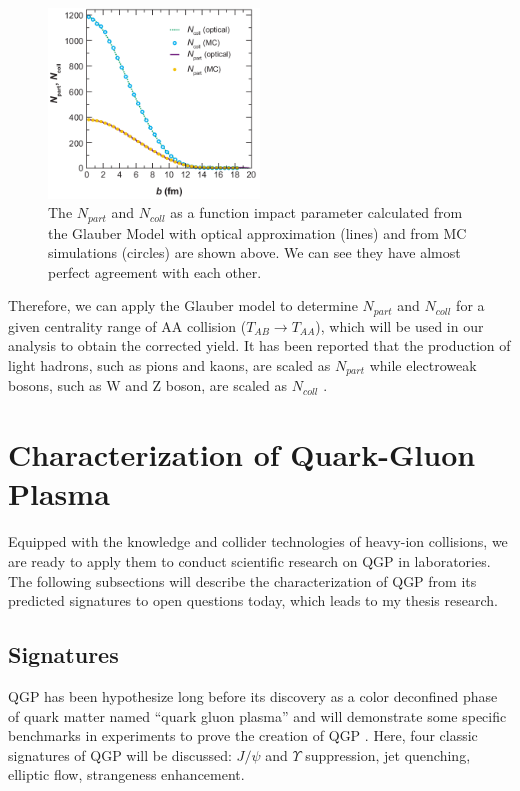 \begin{figure}[hbtp]
\begin{center}
\includegraphics[width=0.50\textwidth]{Figures/Chapter1/NPartandNColl.png}
\caption{The $N_{part}$ and $N_{coll}$ as a function impact parameter calculated from the Glauber Model with optical approximation (lines) and from MC simulations (circles) are shown above. We can see they have almost perfect agreement with each other.}
\label{NPartandNColl}
\end{center}
\end{figure} 


Therefore, we can apply the Glauber model to determine $N_{part}$ and $N_{coll}$ for a given centrality range of AA collision ($T_{AB} \rightarrow T_{AA}$), which will be used in our analysis to obtain the corrected yield. It has been reported that the production of light hadrons, such as pions and kaons, are scaled as $N_{part}$ \cite{NPartScaling} while electroweak bosons, such as W and Z boson, are scaled as $N_{coll}$ \cite{NCollScaling}.

\section{Characterization of Quark-Gluon Plasma}

Equipped with the knowledge and collider technologies of heavy-ion collisions, we are ready to apply them to conduct scientific research on QGP in laboratories. The following subsections will describe the characterization of QGP from its predicted signatures to open questions today, which leads to my thesis research.

\subsection{Signatures}

QGP has been hypothesize long before its discovery as a color deconfined phase of quark matter named ``quark gluon plasma'' \cite{LeonQGP} and will demonstrate some specific benchmarks in experiments to prove the creation of QGP \cite{QGPSignature}. Here, four classic signatures of QGP will be discussed: $J/\psi$ and $\Upsilon$ suppression, jet quenching, elliptic flow, strangeness enhancement.  

